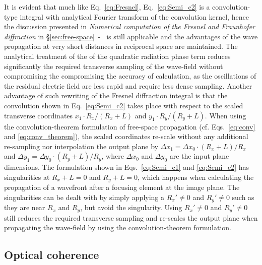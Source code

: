 \begin{refsection}
It is evident that much like Eq.~\ref{eq:Fresnel}, Eq.~\ref{eq:Semi_c2} is a convolution-type integral with analytical Fourier transform of the convolution kernel, hence the discussion presented in \textit{Numerical computation of the Fresnel and Fraunhofer diffraction} in \S\ref{sec:free-space}~-~\textit{} is still applicable and the advantages of the wave propagation at very short distances in reciprocal space are maintained. The analytical treatment of the of the quadratic radiation phase term reduces significantly the required transverse sampling of the wave-field without compromising the compromising the accuracy of calculation, as the oscillations of the residual electric field are less rapid and require less dense sampling. Another advantage of such rewriting of the Fresnel diffraction integral is that the convolution shown in Eq.~\ref{eq:Semi_c2} takes place with respect to the scaled transverse coordinates $x_1\cdot R_x/(R_x+L)$ and $y_1\cdot R_y/(R_y+L)$. When using the convolution-theorem formulation of free-space propagation (cf. Eqs.~\ref{eq:conv} and \ref{eq:conv_theorem}), the scaled coordinates re-scale without any additional re-sampling nor interpolation the output plane by $\Delta x_1 = \Delta x_0 \cdot (R_x+L)/R_x$ and  $\Delta y_1 = \Delta y_0 \cdot (R_y+L)/R_y$, where $\Delta x_0$ and $\Delta y_0$ are the input plane dimensions. The formulation shown in Eqs.~\ref{eq:Semi_c1} and \ref{eq:Semi_c2} has singularities at $R_x+L = 0$ and $R_y+L = 0$, which happens when calculating the propagation of a wavefront after a focusing element at the image plane. The singularities can be dealt with by simply applying a $R_x'\neq0$ and $R_y'\neq0$ such as they are near $R_x$ and $R_y$, but avoid the singularity. Using  $R_x'\neq0$ and $R_y'\neq0$ still reduces the required transverse sampling and re-scales the output plane when propagating the wave-field by using the convolution-theorem formulation.

\subsection{Optical coherence}\label{sec:optical_coherence}


\end{refsection}
